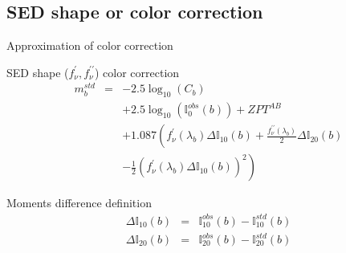 \documentclass{beamer}
\begin{document}
\subsection{SED shape or color correction}
\begin{frame}{Approximation of color correction}
\begin{alertblock}{SED shape ($f^\prime_\nu,f^{\prime\prime}_\nu$) color correction}
\begin{eqnarray}
m_b^{std} & = & -2.5 \log_{10}(C_b)  \nonumber \\
          &   &  + 2.5 \log_{10}(\mathbb{I}_0^{obs}(b)) + ZPT^{AB}  \nonumber \\
          &   &  + 1.087\left( f_\nu^\prime(\lambda_b) \Delta \mathbb{I}_{10}(b) +
          \frac{f_\nu^{\prime\prime}(\lambda_b)}{2}\Delta \mathbb{I}_{20}(b) \right. \nonumber \\
         & & - \left. \frac{1}{2}\left( f_\nu^\prime(\lambda_b) \Delta \mathbb{I}_{10}(b) \right)^2             
          \right)
\end{eqnarray}
\end{alertblock}
\begin{block}{Moments difference definition}
\begin{eqnarray}
\Delta \mathbb{I}_{10}(b) & = &  \mathbb{I}_{10}^{obs}(b)  -  \mathbb{I}_{10}^{std}(b) \\
\Delta \mathbb{I}_{20}(b) & = &   \mathbb{I}_{20}^{obs}(b)  -  \mathbb{I}_{20}^{std}(b) 
\end{eqnarray}
\end{block}
\end{frame}
\end{document}
